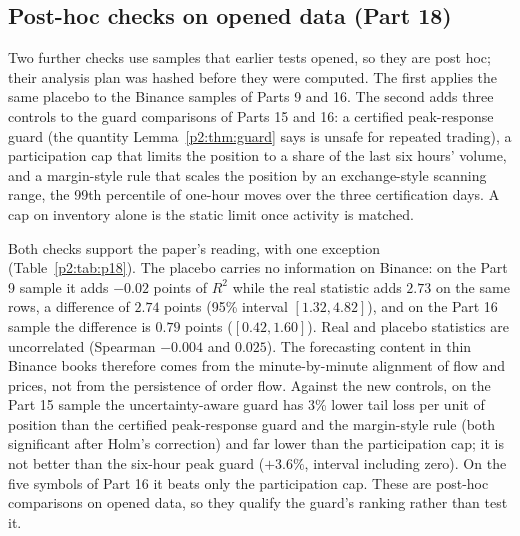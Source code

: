 \subsection{Post-hoc checks on opened data (Part 18)}\label{p2:sec:p18}
Two further checks use samples that earlier tests opened, so they are post hoc; their analysis plan was hashed before they were computed. The first applies the same placebo to the Binance samples of Parts 9 and 16. The second adds three controls to the guard comparisons of Parts 15 and 16: a certified peak-response guard (the quantity Lemma~\ref{p2:thm:guard} says is unsafe for repeated trading), a participation cap that limits the position to a share of the last six hours' volume, and a margin-style rule that scales the position by an exchange-style scanning range, the 99th percentile of one-hour moves over the three certification days. A cap on inventory alone is the static limit once activity is matched.

Both checks support the paper's reading, with one exception (Table~\ref{p2:tab:p18}). The placebo carries no information on Binance: on the Part 9 sample it adds $-0.02$ points of $R^2$ while the real statistic adds $2.73$ on the same rows, a difference of $2.74$ points (95\% interval $[1.32,4.82]$), and on the Part 16 sample the difference is $0.79$ points ($[0.42,1.60]$). Real and placebo statistics are uncorrelated (Spearman $-0.004$ and $0.025$). The forecasting content in thin Binance books therefore comes from the minute-by-minute alignment of flow and prices, not from the persistence of order flow. Against the new controls, on the Part 15 sample the uncertainty-aware guard has 3\% lower tail loss per unit of position than the certified peak-response guard and the margin-style rule (both significant after Holm's correction) and far lower than the participation cap; it is not better than the six-hour peak guard ($+3.6\%$, interval including zero). On the five symbols of Part 16 it beats only the participation cap. These are post-hoc comparisons on opened data, so they qualify the guard's ranking rather than test it.

